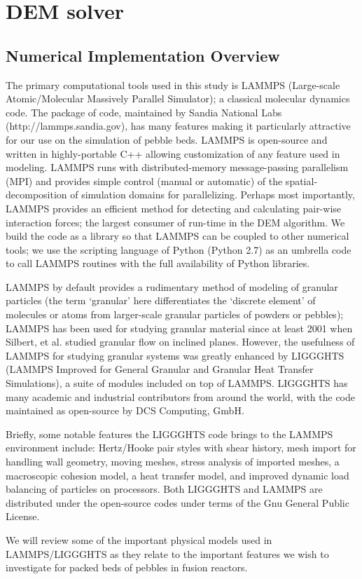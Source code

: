 \section{DEM solver}\label{sec:dem-solver}

\subsection{Numerical Implementation Overview}

The primary computational tools used in this study is LAMMPS (Large-scale Atomic/Molecular Massively Parallel Simulator)\cite{Plimpton1995}; a classical molecular dynamics code. The package of code, maintained by Sandia National Labs (http://lammps.sandia.gov), has many features making it particularly attractive for our use on the simulation of pebble beds. LAMMPS is open-source and written in highly-portable C++ allowing customization of any feature used in modeling. LAMMPS runs with distributed-memory message-passing parallelism (MPI) and provides simple control (manual or automatic) of the spatial-decomposition of simulation domains for parallelizing. Perhaps most importantly, LAMMPS provides an efficient method for detecting and calculating pair-wise interaction forces; the largest consumer of run-time in the DEM algorithm\cite{Plimpton1995}. We build the code as a library so that LAMMPS can be coupled to other numerical tools; we use the scripting language of Python (Python 2.7) as an umbrella code to call LAMMPS routines with the full availability of Python libraries. 

LAMMPS by default provides a rudimentary method of modeling of granular particles (the term `granular' here differentiates the `discrete element' of molecules or atoms from larger-scale granular particles of powders or pebbles); LAMMPS has been used for studying granular material since at least 2001 when Silbert, et al.\cite{Silbert2001} studied granular flow on inclined planes. However, the usefulness of LAMMPS for studying granular systems was greatly enhanced by LIGGGHTS (LAMMPS Improved for General Granular and Granular Heat Transfer Simulations), a suite of modules included on top of LAMMPS. LIGGGHTS has many academic and industrial contributors from around the world, with the code maintained as open-source by DCS Computing, GmbH.

Briefly, some notable features the LIGGGHTS code brings to the LAMMPS environment include: Hertz/Hooke pair styles with shear history, mesh import for handling wall geometry, moving meshes, stress analysis of imported meshes, a macroscopic cohesion model, a heat transfer model, and improved dynamic load balancing of particles on processors\cite{Kloss2011,Kloss2012}. Both LIGGGHTS and LAMMPS are distributed under the open-source codes under terms of the Gnu General Public License.

We will review some of the important physical models used in LAMMPS/LIGGGHTS as they relate to the important features we wish to investigate for packed beds of pebbles in fusion reactors.


